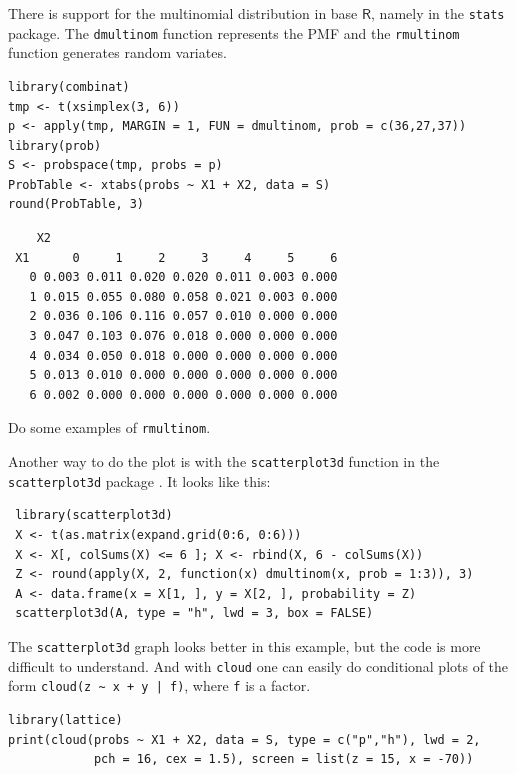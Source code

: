 \documentclass[captions=tableheading]{scrbook}
\begin{document}
There is support for the multinomial distribution in base \(\mathsf{R}\), namely in the \texttt{stats} package. The \texttt{dmultinom} function represents the PMF and the \texttt{rmultinom} function generates random variates.




\lstset{language=R}
\begin{lstlisting}
library(combinat)
tmp <- t(xsimplex(3, 6))
p <- apply(tmp, MARGIN = 1, FUN = dmultinom, prob = c(36,27,37))
library(prob)
S <- probspace(tmp, probs = p)
ProbTable <- xtabs(probs ~ X1 + X2, data = S)
round(ProbTable, 3)
\end{lstlisting}

\begin{verbatim}
    X2
 X1      0     1     2     3     4     5     6
   0 0.003 0.011 0.020 0.020 0.011 0.003 0.000
   1 0.015 0.055 0.080 0.058 0.021 0.003 0.000
   2 0.036 0.106 0.116 0.057 0.010 0.000 0.000
   3 0.047 0.103 0.076 0.018 0.000 0.000 0.000
   4 0.034 0.050 0.018 0.000 0.000 0.000 0.000
   5 0.013 0.010 0.000 0.000 0.000 0.000 0.000
   6 0.002 0.000 0.000 0.000 0.000 0.000 0.000
\end{verbatim}

Do some examples of \texttt{rmultinom}.

Another way to do the plot is with the \texttt{scatterplot3d} function in the \texttt{scatterplot3d} package \cite{Liggesscatterplot3d}. It looks like this: 
\begin{verbatim}
 library(scatterplot3d)
 X <- t(as.matrix(expand.grid(0:6, 0:6)))
 X <- X[, colSums(X) <= 6 ]; X <- rbind(X, 6 - colSums(X))
 Z <- round(apply(X, 2, function(x) dmultinom(x, prob = 1:3)), 3)
 A <- data.frame(x = X[1, ], y = X[2, ], probability = Z)
 scatterplot3d(A, type = "h", lwd = 3, box = FALSE)
\end{verbatim}
The \texttt{scatterplot3d} graph looks better in this example, but the code is more difficult to understand. And with \texttt{cloud} one can easily do conditional plots of the form \texttt{cloud(z \textasciitilde{} x + y | f)}, where \texttt{f} is a factor.


\lstset{language=R}
\begin{lstlisting}
library(lattice)
print(cloud(probs ~ X1 + X2, data = S, type = c("p","h"), lwd = 2, 
            pch = 16, cex = 1.5), screen = list(z = 15, x = -70))
\end{lstlisting}
\end{document}
